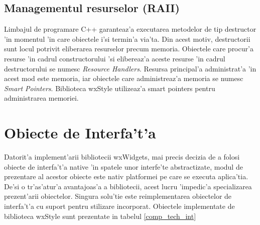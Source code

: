 \subsection{Managementul resurselor (RAII)}

Limbajul de programare C++ garanteaz'a executarea metodelor de tip destructor 'in momentul 'in care obiectele i'si termin'a via'ta. Din acest motiv, destructorii sunt locul potrivit eliberarea resurselor precum memoria. Obiectele care procur'a resurse 'in cadrul constructorului 'si elibereaz'a aceste resurse 'in cadrul destructorului se numesc \emph{Resource Handlers}. Resursa principal'a administrat'a 'in acest mod este memoria, iar obiectele care administreaz'a memoria se numesc \emph{Smart Pointers}. Biblioteca wxStyle utilizeaz'a smart pointers pentru administrarea memoriei.


\section{Obiecte de Interfa't'a}

Datorit'a implement'arii bibliotecii wxWidgets, mai precis decizia de a folosi obiecte de interfa't'a native 'in spatele unor interfe'te abstractizate, modul de prezentare al acestor obiecte este nativ platformei pe care se executa aplica'tia. De'si o tr'as'atur'a avantajoas'a a bibliotecii, acest lucru 'impedic'a specializarea prezent'arii obiectelor. Singura solu'tie este reimplementarea obiectelor de interfa't'a cu suport pentru stilizare incorporat. Obiectele implementate de biblioteca wxStyle sunt prezentate in tabelul \ref{comp_tech_int}

